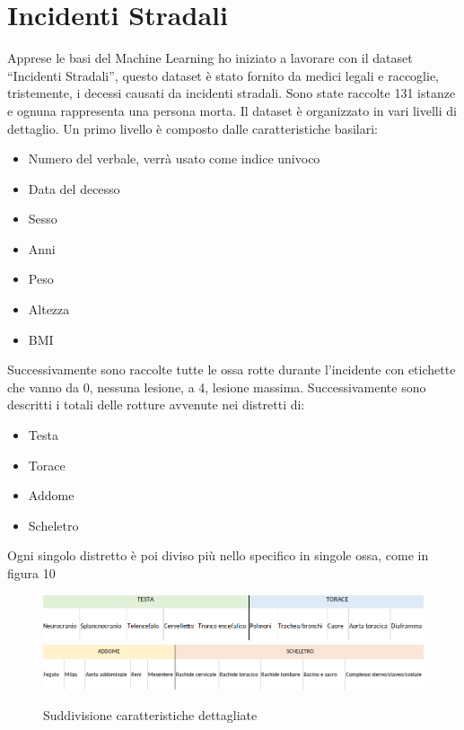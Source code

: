 \documentclass[12pt,italian]{report}
\begin{document}
\section{Incidenti Stradali}
Apprese le basi del Machine Learning ho iniziato a lavorare con il dataset ``Incidenti Stradali'', questo dataset è stato fornito da medici legali e raccoglie, tristemente, i decessi causati da incidenti stradali. Sono state raccolte 131 istanze e ognuna rappresenta una persona morta. Il dataset è organizzato in vari livelli di dettaglio. Un primo livello è composto dalle  caratteristiche basilari:
\begin{itemize}
	\item Numero del verbale, verrà usato come indice univoco
	\item Data del decesso
	\item Sesso
	\item Anni
	\item Peso
	\item Altezza
	\item BMI
\end{itemize}
Successivamente sono raccolte tutte le ossa rotte durante l'incidente con etichette che vanno da 0, nessuna lesione, a 4, lesione massima.
Successivamente sono descritti i totali delle rotture avvenute nei distretti di:
\begin{itemize}
	\item Testa
	\item Torace
	\item Addome
	\item Scheletro
\end{itemize}
Ogni singolo distretto è poi diviso più nello specifico in singole ossa, come in figura 10
\begin{figure}[h]
	\centering
	\includegraphics[width = 160mm]{immagini/testa-torace-dataset}
	\includegraphics[width = 160mm]{immagini/addome-scheletro-dataset}
	\caption{Suddivisione caratteristiche dettagliate}
\end{figure}
\end{document}

